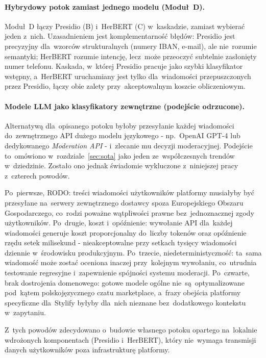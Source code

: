 \paragraph{Hybrydowy potok zamiast jednego modelu (Moduł~D).}
Moduł~D łączy Presidio (B) i~HerBERT (C) w~kaskadzie, zamiast wybierać
jeden z~nich. Uzasadnieniem jest komplementarność błędów: Presidio jest precyzyjny
dla~wzorców strukturalnych (numery IBAN, e-mail), ale nie~rozumie semantyki;
HerBERT rozumie intencję, lecz~może przeoczyć subtelnie zasłonięty numer
telefonu. Kaskada, w~której Presidio pracuje jako szybki klasyfikator wstępny,
a~HerBERT uruchamiany jest tylko dla~wiadomości przepuszczonych przez Presidio,
łączy obie zalety przy~akceptowalnym koszcie obliczeniowym.

\paragraph{Modele LLM jako klasyfikatory zewnętrzne (podejście odrzucone).}
Alternatywą dla~opisanego potoku byłoby przesyłanie każdej wiadomości do~zewnętrznego
API dużego modelu językowego - np.\ OpenAI GPT-4 lub dedykowanego
\textit{Moderation API} \cite{bib:openai-moderation} - i~zlecanie mu
decyzji moderacyjnej. Podejście to~omówiono w~rozdziale~\ref{sec:sota}
jako jeden ze~współczesnych trendów w~dziedzinie. Zostało ono jednak
świadomie wykluczone z~niniejszej pracy z~czterech powodów.

Po~pierwsze, RODO: treści wiadomości użytkowników platformy
musiałyby być przesyłane na~serwery zewnętrznego dostawcy spoza
Europejskiego Obszaru Gospodarczego, co~rodzi poważne wątpliwości
prawne bez~jednoznacznej zgody użytkowników.
Po~drugie, koszt i~opóźnienie: wywołanie API dla~każdej
wiadomości generuje koszt proporcjonalny do~liczby tokenów oraz
opóźnienie rzędu setek milisekund - nieakceptowalne przy setkach
tysięcy wiadomości dziennie w~środowisku produkcyjnym.
Po~trzecie, niedeterministyczność: ta~sama wiadomość może
zostać oceniona inaczej przy~kolejnym wywołaniu, co~utrudnia testowanie
regresyjne i~zapewnienie spójności systemu moderacji.
Po~czwarte, brak dostrojenia domenowego: gotowe modele ogólne
nie~są~optymalizowane pod~kątem polskojęzycznego czatu marketplace,
a~frazy obejścia platformy specyficzne dla~Stylify byłyby dla~nich
nieznane bez~dodatkowego kontekstu w~zapytaniu.

Z~tych powodów zdecydowano o~budowie własnego potoku opartego
na~lokalnie wdrożonych komponentach (Presidio i~HerBERT),
który nie~wymaga transmisji danych użytkowników poza infrastrukturę
platformy.

